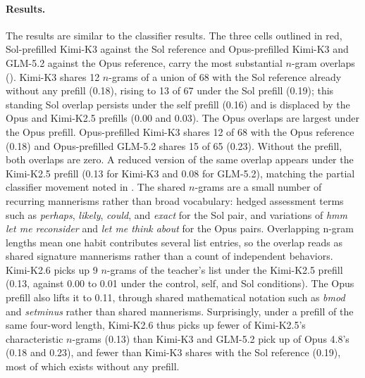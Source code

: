 \paragraph{Results.}
The results are similar to the classifier results. The three cells outlined in red, Sol-prefilled Kimi-K3 against the Sol reference and Opus-prefilled Kimi-K3 and GLM-5.2 against the Opus reference, carry the most substantial $n$-gram overlaps (). Kimi-K3 shares 12 $n$-grams of a union of 68 with the Sol reference already without any prefill (0.18), rising to 13 of 67 under the Sol prefill (0.19); this standing Sol overlap persists under the self prefill (0.16) and is displaced by the Opus and Kimi-K2.5 prefills (0.00 and 0.03). The Opus overlaps are largest under the Opus prefill. Opus-prefilled Kimi-K3 shares 12 of 68 with the Opus reference (0.18) and Opus-prefilled GLM-5.2 shares 15 of 65 (0.23). Without the prefill, both overlaps are zero. A reduced version of the same overlap appears under the Kimi-K2.5 prefill (0.13 for Kimi-K3 and 0.08 for GLM-5.2), matching the partial classifier movement noted in . The shared $n$-grams are a small number of recurring mannerisms rather than broad vocabulary: hedged assessment terms such as \textit{perhaps}, \textit{likely}, \textit{could}, and \textit{exact} for the Sol pair, and variations of \textit{hmm let me reconsider} and \textit{let me think about} for the Opus pairs. Overlapping n-gram lengths mean one habit contributes several list entries, so the overlap reads as shared signature mannerisms rather than a count of independent behaviors. 
Kimi-K2.6 picks up 9 $n$-grams of the teacher's list under the Kimi-K2.5 prefill (0.13, against 0.00 to 0.01 under the control, self, and Sol conditions).
The Opus prefill also lifts it to 0.11, through shared mathematical notation such as \textit{bmod} and \textit{setminus} rather than shared mannerisms.
Surprisingly, under a prefill of the same four-word length, Kimi-K2.6 thus picks up fewer of Kimi-K2.5's characteristic $n$-grams (0.13) than Kimi-K3 and GLM-5.2 pick up of Opus 4.8's (0.18 and 0.23), and fewer than Kimi-K3 shares with the Sol reference (0.19), most of which exists without any prefill.

